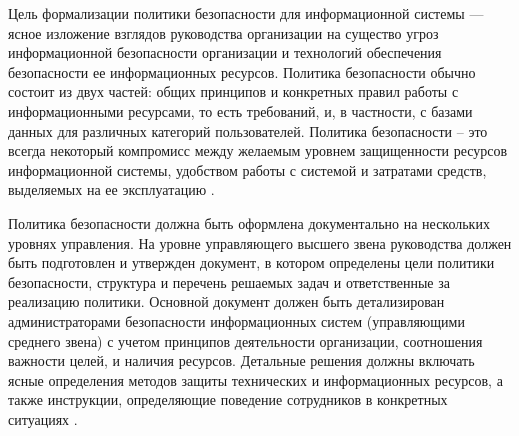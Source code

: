 Цель формализации политики безопасности для информационной системы — ясное изложение взглядов руководства
организации на существо угроз информационной безопасности организации и технологий обеспечения безопасности ее
информационных ресурсов. Политика безопасности обычно состоит из двух частей: общих принципов и конкретных правил
работы с информационными ресурсами, то есть требований, и, в частности, с базами данных для различных категорий
пользователей. Политика безопасности – это всегда некоторый компромисс между желаемым уровнем защищенности ресурсов
информационной системы, удобством работы с системой и затратами средств, выделяемых на ее эксплуатацию \autocite{shveikin}.

Политика безопасности должна быть оформлена документально на нескольких уровнях управления. На уровне управляющего
высшего звена руководства должен быть подготовлен и утвержден документ, в котором определены цели политики
безопасности, структура и перечень решаемых задач и ответственные за реализацию политики. Основной документ
должен быть детализирован администраторами безопасности информационных систем (управляющими среднего звена)
с учетом принципов деятельности организации, соотношения важности целей, и наличия ресурсов. Детальные решения
должны включать ясные определения методов защиты технических и информационных ресурсов, а также инструкции,
определяющие поведение сотрудников в конкретных ситуациях \autocite{shveikin}.

